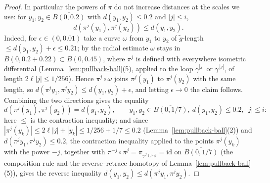 \begin{proof}
In particular the powers of $\pi$ do not increase distances at the
scales we use: for $y_1,y_2\in\overline{B(0,0.2)}$ with
$d(y_1,y_2)\le0.2$ and $|j|\le i$,
$$d\left(\pi^{j}(y_1),\pi^{j}(y_2)\right)\le d(y_1,y_2).$$
Indeed, for $\epsilon\in(0,0.01)$ take a curve
$\omega$ from $y_1$ to $y_2$ of $\tilde g$-length $\le
d(y_1,y_2)+\epsilon\le0.21$; by the radial estimate $\omega$
stays in $B(0,0.2+0.22)\subset B(0,0.45)$, where $\pi^{j}$ is
defined with everywhere isometric differential
(Lemma~\ref{lem:pullback-ball}(5), applied to the loop
$\gamma^{|j|}$ or $\bar\gamma^{\,|j|}$, of length
$2\ell|j|\le1/256$). Hence $\pi^{j}\circ\omega$ joins
$\pi^{j}(y_1)$ to $\pi^{j}(y_2)$ with the same length, so
$d(\pi^{j}y_1,\pi^{j}y_2)\le d(y_1,y_2)+\epsilon$, and letting
$\epsilon\to0$ the claim follows. Combining the two directions
gives the equality
\begin{equation}\label{deckisometry}
d\left(\pi^{j}(y_1),\pi^{j}(y_2)\right)
=d(y_1,y_2),\qquad
y_1,y_2\in\overline{B(0,1/7)},\ d(y_1,y_2)\le0.2,\
|j|\le i:
\end{equation}
here $\le$ is the contraction inequality; and since
$|\pi^{j}(y_k)|\le2\ell|j|+|y_k|\le1/256+1/7\le0.2$
(Lemma~\ref{lem:pullback-ball}(2)) and
$d(\pi^{j}y_1,\pi^{j}y_2)\le0.2$, the contraction inequality
applied to the points $\pi^{j}(y_k)$ with the power $-j$, together
with $\pi^{-j}\circ\pi^{j}=\pi_{\bar\gamma^{\,j}\cup\gamma^{j}}
=\mathrm{id}$ on $\overline{B(0,1/7)}$
(the composition rule and the reverse--retrace homotopy of
Lemma~\ref{lem:pullback-ball}(5)), gives the reverse inequality
$d(y_1,y_2)\le d(\pi^{j}y_1,\pi^{j}y_2)$.


\end{proof}
